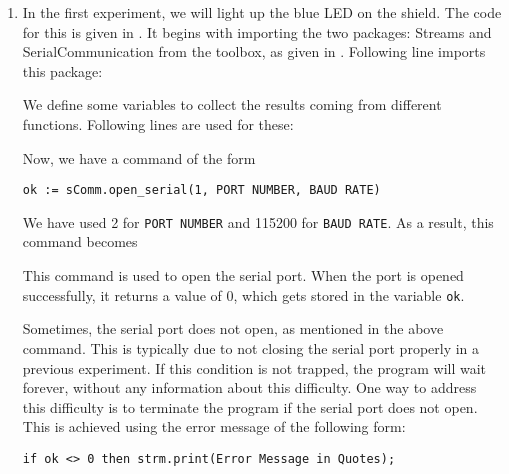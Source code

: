 \begin{enumerate}
  \item In the first experiment, we will light up the blue LED on the
        shield.  The code for this is given in .
        It begins with importing the two packages: Streams and SerialCommunication from the toolbox, as 
        given in . Following line imports this package: 
        

    We define some variables to collect the results coming from different functions. Following 
    lines are used for these:
    

    Now, we have a command of the form 
        \begin{lstlisting}[style=nonumbers]
     ok := sComm.open_serial(1, PORT NUMBER, BAUD RATE)
  \end{lstlisting}
        We have used 2 for {\tt PORT NUMBER} and 115200 for {\tt BAUD RATE}.
        As a result, this command becomes 
        
        This command is used to open the serial port.  When the port is
        opened successfully, it returns a value of 0, which gets stored in
        the variable {\tt ok}.
        
        Sometimes, the serial port does not open, as mentioned in the above
        command.  This is typically due to not closing the serial port
        properly in a previous experiment.  If this condition is not
        trapped, the program will wait forever, without any information
        about this difficulty.  One way to address this difficulty is to
        terminate the program if the serial port does not open.  This is
        achieved using the error message of the following form:
        \begin{lstlisting}[style=nonumbers]
            if ok <> 0 then strm.print(Error Message in Quotes);
        \end{lstlisting}


\end{enumerate}
